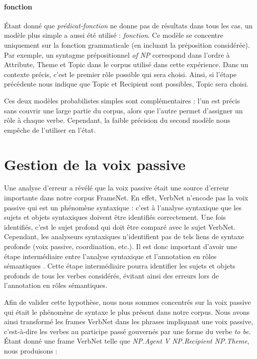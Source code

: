 \paragraph{fonction}

Étant donné que \emph{prédicat-fonction} ne donne pas de résultats dans tous les
cas, un modèle plus simple a aussi été utilisé : \emph{fonction}. Ce modèle se
concentre uniquement sur la fonction grammaticale (en incluant la préposition
considérée). Par exemple, un syntagme prépositionnel \emph{of NP} correspond
dans l'ordre à Attribute, Theme et Topic dans le corpus utilisé dans cette
expérience. Dans un contexte précis, c'est le premier rôle possible qui sera
choisi. Ainsi, si l'étape précédente nous indique que Topic et Recipient sont
possibles, Topic sera choisi.

Ces deux modèles probabilistes simples sont complémentaires : l'un est précis
sans couvrir une large partie du corpus, alors que l'autre permet d'assigner un
rôle à chaque verbe. Cependant, la faible précision du second modèle nous
empêche de l'utiliser en l'état. %

\section{Gestion de la voix passive}
\label{sec:passif}

Une analyse d'erreur a révélé que la voix passive était une source d'erreur
importante dans notre corpus FrameNet. En effet, VerbNet n'encode pas la voix
passive qui est un phénomène syntaxique : c'est à l'analyse syntaxique que les
sujets et objets syntaxiques doivent être identifiés correctement. Une fois
identifiés, c'est le sujet profond qui doit être comparé avec le sujet VerbNet.
Cependant, les analyseurs syntaxiques n'identifient pas de tels liens de
syntaxe profonde (voix passive, coordination, etc.). Il est donc important
d'avoir une étape intermédiaire entre l'analyse syntaxique et l'annotation en
rôles sémantiques \citep{bonfante2011modular, ribeyre2013systeme}. Cette étape
intermédiaire pourra identifier les sujets et objets profonds de tous les
verbes considérés, évitant ainsi des erreurs lors de l'annotation en rôles
sémantiques. 

Afin de valider cette hypothèse, nous nous sommes concentrés sur la voix
passive qui était le phénomène de syntaxe le plus présent dans notre corpus.
Nous avons ainsi transformé les frames VerbNet dans les phrases impliquant une
voix passive, c'est-à-dire les verbes au participe passé gouvernés par une
forme du verbe \emph{to be}. Étant donné une frame VerbNet telle que
\textit{NP.Agent V NP.Recipient NP.Theme}, nous produisons :

